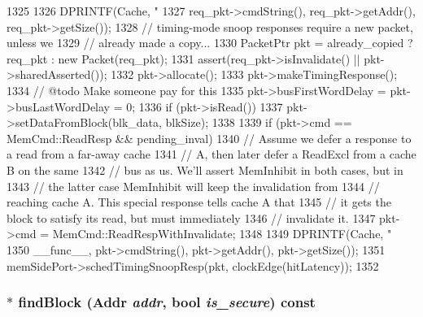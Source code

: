 \begin{DoxyCode}
1325 {
1326     DPRINTF(Cache, "%
1327             req_pkt->cmdString(), req_pkt->getAddr(), req_pkt->getSize());
1328     // timing-mode snoop responses require a new packet, unless we
1329     // already made a copy...
1330     PacketPtr pkt = already_copied ? req_pkt : new Packet(req_pkt);
1331     assert(req_pkt->isInvalidate() || pkt->sharedAsserted());
1332     pkt->allocate();
1333     pkt->makeTimingResponse();
1334     // @todo Make someone pay for this
1335     pkt->busFirstWordDelay = pkt->busLastWordDelay = 0;
1336     if (pkt->isRead()) {
1337         pkt->setDataFromBlock(blk_data, blkSize);
1338     }
1339     if (pkt->cmd == MemCmd::ReadResp && pending_inval) {
1340         // Assume we defer a response to a read from a far-away cache
1341         // A, then later defer a ReadExcl from a cache B on the same
1342         // bus as us.  We'll assert MemInhibit in both cases, but in
1343         // the latter case MemInhibit will keep the invalidation from
1344         // reaching cache A.  This special response tells cache A that
1345         // it gets the block to satisfy its read, but must immediately
1346         // invalidate it.
1347         pkt->cmd = MemCmd::ReadRespWithInvalidate;
1348     }
1349     DPRINTF(Cache, "%
1350             __func__, pkt->cmdString(), pkt->getAddr(), pkt->getSize());
1351     memSidePort->schedTimingSnoopResp(pkt, clockEdge(hitLatency));
1352 }
\end{DoxyCode}
\hypertarget{classCache_a4789f9031d3220604c62c0e31a94c539}{
\subsubsection[{findBlock}]{$\ast$ findBlock ({\bf Addr} {\em addr}, \/  bool {\em is\_\-secure}) const}}
\label{classCache_a4789f9031d3220604c62c0e31a94c539}



